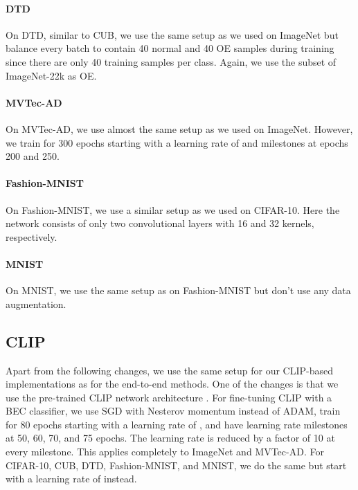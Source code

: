 \documentclass[10pt]{article} \usepackage[accepted]{stylefiles/tmlr}
\begin{document}
\paragraph{DTD}
On DTD, similar to CUB, we use the same setup as we used on ImageNet but balance every batch to contain 40 normal and 40 OE samples during training since there are only 40 training samples per class.
Again, we use the subset of ImageNet-22k as OE. 


\paragraph{MVTec-AD}
On MVTec-AD, we use almost the same setup as we used on ImageNet.
However, we train for 300 epochs starting with a learning rate of  and milestones at epochs 200 and 250. 

\paragraph{Fashion-MNIST}
On Fashion-MNIST, we use a similar setup as we used on CIFAR-10. Here the network consists of only two convolutional layers with 16 and 32 kernels, respectively. 


\paragraph{MNIST}
On MNIST, we use the same setup as on Fashion-MNIST but don't use any data augmentation.



\subsection{CLIP}
Apart from the following changes, we use the same setup for our CLIP-based implementations as for the end-to-end methods.
One of the changes is that we use the pre-trained CLIP network architecture \citep{radford2021learning}.
For fine-tuning CLIP with a BEC classifier, we use SGD with Nesterov momentum instead of ADAM, train for 80 epochs starting with a learning rate of , and have learning rate milestones at 50, 60, 70, and 75 epochs. 
The learning rate is reduced by a factor of 10 at every milestone.
This applies completely to ImageNet and MVTec-AD.
For CIFAR-10, CUB, DTD, Fashion-MNIST, and MNIST, we do the same but start with a learning rate of  instead.
\end{document}
